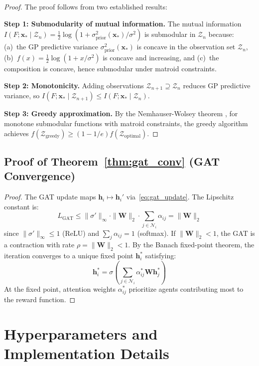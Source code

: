 \documentclass[12pt,a4paper]{article}
\DeclareRobustCommand{\cN}{\mathcal{N}}
\DeclareRobustCommand{\cZ}{\mathcal{Z}}
\DeclareRobustCommand{\vect}[1]{\bm{#1}}
\DeclareRobustCommand{\mat}[1]{\bm{#1}}
\begin{document}
\begin{proof}
The proof follows from two established results:

\textbf{Step 1: Submodularity of mutual information.} The mutual information $I(F; \vect{x}_* \mid \cZ_n) = \frac{1}{2}\log(1 + \sigma^2_{\text{prior}}(\vect{x}_*)/\sigma^2)$ is submodular in $\cZ_n$ because: (a)~the GP predictive variance $\sigma^2_{\text{prior}}(\vect{x}_*)$ is concave in the observation set $\cZ_n$, (b)~$f(x) = \frac{1}{2}\log(1 + x/\sigma^2)$ is concave and increasing, and (c)~the composition is concave, hence submodular under matroid constraints.

\textbf{Step 2: Monotonicity.} Adding observations $\cZ_{n+1} \supseteq \cZ_n$ reduces GP predictive variance, so $I(F; \vect{x}_* \mid \cZ_{n+1}) \leq I(F; \vect{x}_* \mid \cZ_n)$.

\textbf{Step 3: Greedy approximation.} By the Nemhauser-Wolsey theorem \cite{Nemhauser1978}, for monotone submodular functions with matroid constraints, the greedy algorithm achieves $f(\cZ_{\text{greedy}}) \geq (1 - 1/e) f(\cZ_{\text{optimal}})$.
\end{proof}

\subsection{Proof of Theorem~\ref{thm:gat_conv} (GAT Convergence)}

\begin{proof}
The GAT update maps $\vect{h}_i \mapsto \vect{h}_i'$ via~\eqref{eq:gat_update}. The Lipschitz constant is:
\begin{equation}
    L_{\text{GAT}} \leq \|\sigma'\|_\infty \cdot \|\mat{W}\|_2 \cdot \sum_{j \in \cN_i} \alpha_{ij} = \|\mat{W}\|_2
\end{equation}
since $\|\sigma'\|_\infty \leq 1$ (ReLU) and $\sum_j \alpha_{ij} = 1$ (softmax). If $\|\mat{W}\|_2 < 1$, the GAT is a contraction with rate $\rho = \|\mat{W}\|_2 < 1$. By the Banach fixed-point theorem, the iteration converges to a unique fixed point $\vect{h}_i^*$ satisfying:
\begin{equation}
    \vect{h}_i^* = \sigma\left(\sum_{j \in \cN_i} \alpha_{ij}^* \mat{W}\vect{h}_j^*\right)
\end{equation}
At the fixed point, attention weights $\alpha_{ij}^*$ prioritize agents contributing most to the reward function.
\end{proof}


\section{Hyperparameters and Implementation Details}
\label{app:hyperparams}
\end{document}
